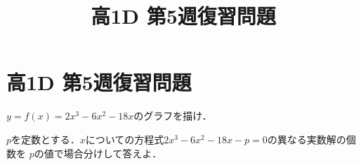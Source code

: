 \documentclass[b5paper,uplatex]{jsarticle}
\title{高1D 第5週復習問題}
\author{}
\date{}
\begin{document}
\section*{高1D 第5週復習問題}
\begin{enumarabicp}
  \item $y=f(x)=2x^3-6x^2-18x$のグラフを描け．
  \item $p$を定数とする．$x$についての方程式$2x^3-6x^2-18x-p=0$の異なる実数解の個数を
  $p$の値で場合分けして答えよ．
\end{enumarabicp}
\end{document}
